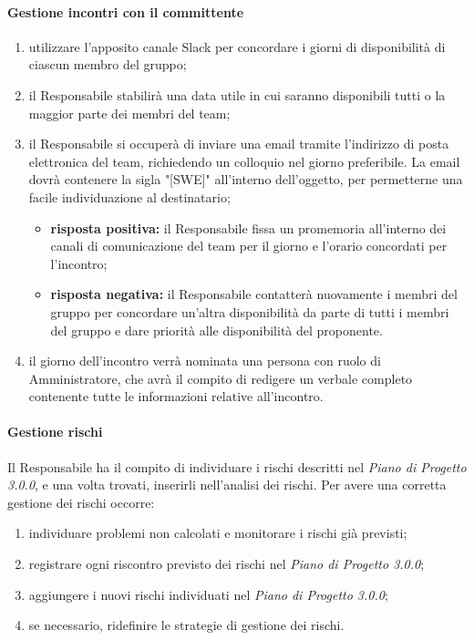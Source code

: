 	\paragraph{Gestione incontri con il committente}
	\begin{enumerate}
		\item utilizzare l'apposito canale Slack per concordare i giorni di disponibilità di ciascun membro del gruppo;
		\item il Responsabile stabilirà una data utile in cui saranno disponibili tutti o la maggior parte dei membri del team;
		\item il Responsabile si occuperà di inviare una email tramite l'indirizzo di posta elettronica del team, richiedendo un colloquio nel giorno preferibile. La email dovrà contenere la sigla "[SWE]" all'interno dell'oggetto, per permetterne una facile individuazione al destinatario;
		\begin{itemize}
			\item \textbf{risposta positiva:} il Responsabile fissa un promemoria all'interno dei canali di comunicazione del team per il giorno e l'orario concordati per l'incontro;
			\item \textbf{risposta negativa:} il Responsabile contatterà nuovamente i membri del gruppo per concordare un'altra disponibilità da parte di tutti i membri del gruppo e dare priorità alle disponibilità del proponente.
		\end{itemize}
		\item il giorno dell'incontro verrà nominata una persona con ruolo di Amministratore, che avrà il compito di redigere un verbale completo contenente tutte le informazioni relative all'incontro.
	\end{enumerate}

	\paragraph{Gestione rischi}
	Il Responsabile ha il compito di individuare i rischi descritti nel \textit{Piano di Progetto 3.0.0\docs}, e una volta trovati, inserirli nell'analisi dei rischi. Per avere una corretta gestione dei rischi occorre:
	\begin{enumerate}
		\item individuare problemi non calcolati e monitorare i rischi già previsti;
		\item registrare ogni riscontro previsto dei rischi nel \textit{Piano di Progetto 3.0.0\docs};
		\item aggiungere i nuovi rischi individuati nel \textit{Piano di Progetto 3.0.0\docs};
		\item se necessario, ridefinire le strategie di gestione dei rischi.
	\end{enumerate}


